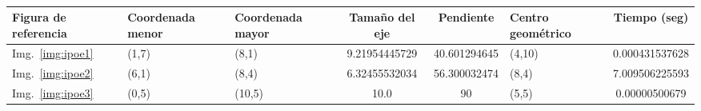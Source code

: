 \begin{table}[ht!]
	\centering
	\begin{tabular}{p{.6in}|p{.7in}|p{.7in}|c|c|p{.7in}|c}
		Figura de referencia & Coordenada menor & Coordenada mayor & Tamaño del eje & Pendiente & Centro geom\'etrico & Tiempo (seg) \\\hline\hline
		Img.~\ref{img:ipoe1} & (1,7) & (8,1)  & 9.21954445729 & 40.601294645 & (4,10) & 0.000431537628 \\\hline
		Img.~\ref{img:ipoe2} & (6,1) & (8,4)  & 6.32455532034 & 56.300032474 & (8,4)  & 7.009506225593 \\\hline
		Img.~\ref{img:ipoe3} & (0,5) & (10,5) & 10.0          & 90           & (5,5)  & 0.00000500679  \\
	\end{tabular}
	\caption{}
	\label{tab:ocg}
\end{table}


